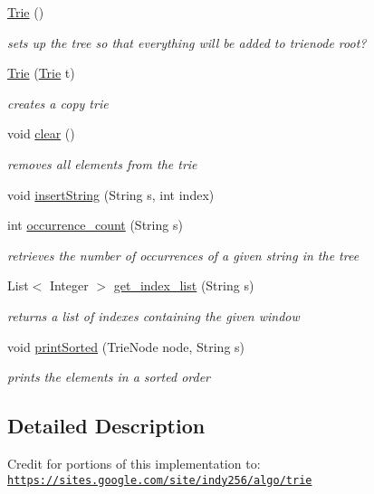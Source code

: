 \begin{DoxyCompactItemize}
\item 
\hyperlink{classtrie_1_1_trie_a73835e6c18e8a44616d8995fd8f8a359}{Trie} ()
\begin{DoxyCompactList}\small\item\em sets up the tree so that everything will be added to trienode root? \end{DoxyCompactList}\item 
\hyperlink{classtrie_1_1_trie_abcb888636eae05bbb59fb418fcf46732}{Trie} (\hyperlink{classtrie_1_1_trie}{Trie} t)
\begin{DoxyCompactList}\small\item\em creates a copy trie \end{DoxyCompactList}\item 
void \hyperlink{classtrie_1_1_trie_aeca1e283716cb4db6e52907049d08acb}{clear} ()
\begin{DoxyCompactList}\small\item\em removes all elements from the trie \end{DoxyCompactList}\item 
void \hyperlink{classtrie_1_1_trie_afc2ab785d2546e95b2698c46f76d9c77}{insert\+String} (String s, int index)
\item 
int \hyperlink{classtrie_1_1_trie_a061c92ea6abc9e1d9e6e6ac5c0c0b4b2}{occurrence\+\_\+count} (String s)
\begin{DoxyCompactList}\small\item\em retrieves the number of occurrences of a given string in the tree \end{DoxyCompactList}\item 
List$<$ Integer $>$ \hyperlink{classtrie_1_1_trie_a0755a2fdc3ebc07406db5a5ff1310f38}{get\+\_\+index\+\_\+list} (String s)
\begin{DoxyCompactList}\small\item\em returns a list of indexes containing the given window \end{DoxyCompactList}\item 
void \hyperlink{classtrie_1_1_trie_a3faeec11a80f63081cde7973fe32be50}{print\+Sorted} (Trie\+Node node, String s)
\begin{DoxyCompactList}\small\item\em prints the elements in a sorted order \end{DoxyCompactList}\end{DoxyCompactItemize}


\subsection{Detailed Description}
Credit for portions of this implementation to\+: \href{https://sites.google.com/site/indy256/algo/trie}{\tt https\+://sites.\+google.\+com/site/indy256/algo/trie} 

